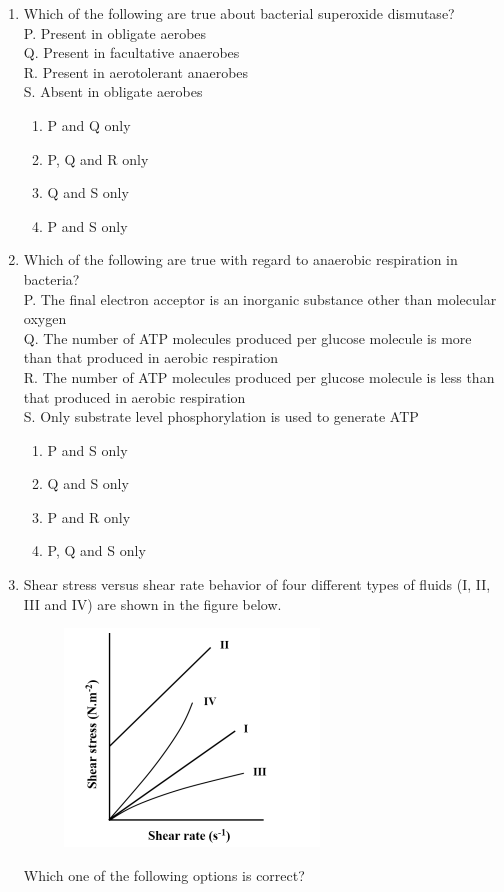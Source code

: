 \documentclass[journal,12pt,onecolumn]{IEEEtran}
\theoremstyle{remark}
\begin{document}
\begin{enumerate}
    \item Which of the following are true about bacterial superoxide dismutase?\\
    P. Present in obligate aerobes\\
    Q. Present in facultative anaerobes\\
    R. Present in aerotolerant anaerobes\\
    S. Absent in obligate aerobes
    \begin{multicols}{2}
    \begin{enumerate}
        \item P and Q only
        \item P, Q and R only
        \item Q and S only
        \item P and S only
    \end{enumerate}
    \end{multicols}
    \item Which of the following are true with regard to anaerobic respiration in bacteria?\\
    P. The final electron acceptor is an inorganic substance other than molecular oxygen\\
    Q. The number of ATP molecules produced per glucose molecule is more than that produced in aerobic respiration\\
    R. The number of ATP molecules produced per glucose molecule is less than that produced in aerobic respiration\\
    S. Only substrate level phosphorylation is used to generate ATP
    \begin{multicols}{2}
    \begin{enumerate}
        \item P and S only
        \item Q and S only
        \item P and R only
        \item P, Q and S only
    \end{enumerate}
    \end{multicols}

    \item Shear stress versus shear rate behavior of four different types of fluids (I, II, III and IV) are shown in the figure below.
    \begin{figure}[H]
    \centering
    \includegraphics[width = 0.5\columnwidth]{fig/Q36.png}
    \caption*{}
    \label{fig:Q36}
\end{figure}
    Which one of the following options is correct?
    

\end{enumerate}
\end{document}
